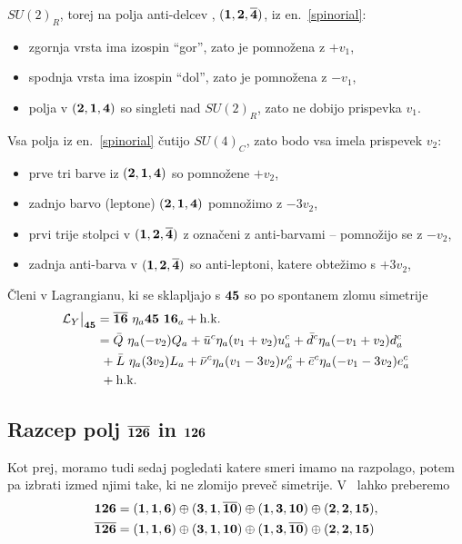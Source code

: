 $SU(2)_R$, torej na polja anti-delcev , $(\mathbf{1}, \mathbf{2}, \overline{\mathbf{4}})$, iz en.~\eqref{spinorial}:
\begin{itemize}
	\item{zgornja vrsta ima izospin "`gor"', zato je pomnožena z $+v_1$,}
	\item{spodnja vrsta ima izospin "`dol"', zato je pomnožena z $-v_1$,}
	\item{polja v $(\mathbf{2}, \mathbf{1}, \mathbf{4})$ so singleti nad $SU(2)_R$, zato ne dobijo prispevka $v_1$.}
\end{itemize}
Vsa polja iz en.~\eqref{spinorial} čutijo $SU(4)_C$, zato bodo vsa imela prispevek $v_2$:
\begin{itemize}
	\item{prve tri barve iz $(\mathbf{2}, \mathbf{1}, \mathbf{4})$ so pomnožene $+v_2$,}
	\item{zadnjo barvo (leptone) $(\mathbf{2}, \mathbf{1}, \mathbf{4})$ pomnožimo z $-3 v_2$,}
	\item{prvi trije stolpci v $(\mathbf{1}, \mathbf{2}, \overline{\mathbf{4}})$ z označeni z anti-barvami -- pomnožijo se z $-v_2$,}
	\item{zadnja anti-barva v $(\mathbf{1}, \mathbf{2}, \overline{\mathbf{4}})$ so anti-leptoni, katere obtežimo s $+3 v_2$,}
\end{itemize}
Členi v Lagrangianu, ki se sklapljajo s $\mathbf{45}$ so po spontanem zlomu simetrije
\begin{align}
	\mathcal{L}_Y\big|_{\rep{45}} &= \repb{16}\ \eta_a\rep{45}\ \rep{16}_a + \text{h.k.}\notag \\
	&= \bar{Q}\ \eta_a (-v_2) Q_a + \bar{u}^c \eta_a (v_1 + v_2) u^c_a + \bar{d}^c \eta_a (-v_1 + v_2)
		d^c_a \notag \\
	&\ + \bar{L}\ \eta_a (3 v_2)L_a + \bar{\nu}^c \eta_a (v_1 - 3v_2) \nu^c_a + \bar{e}^c \eta_a
		(-v_1 - 3v_2) e^c_a \notag \\
	&\ + \text{h.k.}
	\label{mixed45}
\end{align}

\subsection{Razcep polj $\overline{\mathbf{126}}$ in $\mathbf{126}$}

Kot prej, moramo tudi sedaj pogledati katere smeri imamo na razpolago, potem pa izbrati izmed njimi
take, ki ne zlomijo preveč simetrije. V~\cite{slansky} lahko preberemo
\begin{align}
	\mathbf{126} &= (\mathbf{1}, \mathbf{1}, \mathbf{6}) \oplus (\mathbf{3}, \mathbf{1}, \overline{\mathbf{10}}) \oplus (\mathbf{1}, \mathbf{3}, \mathbf{10})
		\oplus (\mathbf{2}, \mathbf{2}, \mathbf{15}), \notag \\
	\overline{\mathbf{126}} &= (\mathbf{1}, \mathbf{1}, \mathbf{6}) \oplus (\mathbf{3}, \mathbf{1}, \mathbf{10}) \oplus (\mathbf{1}, \mathbf{3}, \overline{\mathbf{10}})
		\oplus (\mathbf{2}, \mathbf{2}, \mathbf{15})
\end{align}

